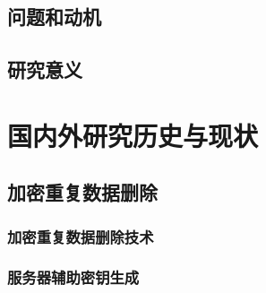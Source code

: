 







\subsection{问题和动机}
\subsection{研究意义}





\section{国内外研究历史与现状}

\subsection{加密重复数据删除}
\subsubsection{加密重复数据删除技术}
\subsubsection{服务器辅助密钥生成}
